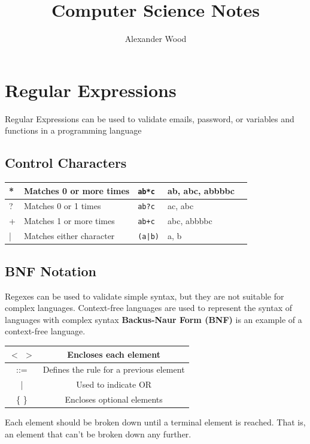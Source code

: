 \documentclass{article}
\author{Alexander Wood}
\title{Computer Science Notes}
\begin{document}
\maketitle
  
\tableofcontents


\section{Regular Expressions}
Regular Expressions can be used to validate emails, password, or variables 
and functions in a programming language

\subsection{Control Characters}
\begin{tabular}{|l|l|l|l|l|}
\hline
* & Matches 0 or more times & \verb/ab*c/ & ab, abc, abbbbc \\ \hline
? & Matches 0 or 1 times & \verb/ab?c/ & ac, abc \\ \hline
+ & Matches 1 or more times & \verb/ab+c/ & abc, abbbbc \\ \hline
| & Matches either character & \verb/(a|b)/ & a, b \\ \hline
\end{tabular}



\subsection{BNF Notation}

Regexes can be used to validate simple syntax, but they are not suitable for complex languages.
Context-free languages are used to represent the syntax of languages with complex syntax \textbf{Backus-Naur Form (BNF)} is an example of a context-free language.
\newline
\begin{tabular}{|c|c|} 
\hline
$<$ $>$ & Encloses each element \\ \hline
::= & Defines the rule for a previous element \\ \hline
| & Used to indicate OR \\ \hline
\{ \} & Encloses optional elements \\ \hline
\end{tabular}
\newline

Each element should be broken down until a terminal element is reached. That is,
 an element that can't be broken down any further.
\end{document}
